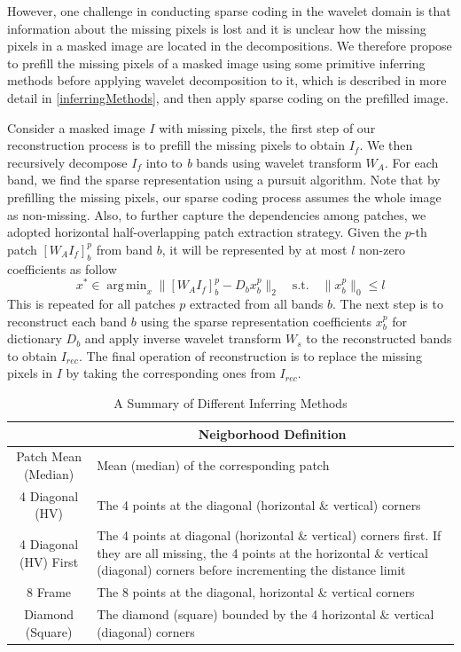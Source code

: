 \documentclass[conference]{IEEEtran}
\begin{document}
However, one challenge in conducting sparse coding in the wavelet domain is that information about the missing pixels is lost and it is unclear how the missing pixels in a masked image are located in the decompositions. We therefore propose to prefill the missing pixels of a masked image using some primitive inferring methods before applying wavelet decomposition to it, which is described in more detail in \ref{inferringMethods}, and then apply sparse coding on the prefilled image.

Consider a masked image $I$ with missing pixels, the first step of our reconstruction process is to prefill the missing pixels to obtain $I_f$. We then recursively decompose $I_f$ into to \textit{b} bands using wavelet transform $W_A$. For each band, we find the sparse representation using a pursuit algorithm. Note that by prefilling the missing pixels, our sparse coding process assumes the whole image as non-missing. Also, to further capture the dependencies among patches, we adopted horizontal half-overlapping patch extraction strategy. Given the $p$-th patch $[W_AI_f]^{p}_b$ from band $b$, it will be represented by at most $l$ non-zero coefficients as follow
\begin{equation}
x^{*} \in \operatorname{arg\,min}_x \|[W_AI_f]^{p}_b-D_bx^{p}_b\|_2
\quad \text{s.t.} \quad \|x^{p}_b\|_0 \leq l
\end{equation}
This is repeated for all patches $p$ extracted from all bands $b$. The next step is to reconstruct each band $b$ using the sparse representation coefficients $x^{p}_b$ for dictionary $D_b$ and apply inverse wavelet transform $W_s$ to the reconstructed bands to obtain $I_{rec}$. The final operation of reconstruction is to replace the missing pixels in $I$ by taking the corresponding ones from $I_{rec}$.

\begin{table}
\centering
\renewcommand{\arraystretch}{1.1}
\caption{A Summary of Different Inferring Methods}
\label{inferringMethodsTable}
\begin{tabular}{m{2cm} m{5.5cm}}
\hline
\rowcolor{lightgray}\multicolumn{1}{c}{Method Name} & \multicolumn{1}{c}{Neigborhood Definition}\\
\hline
\multicolumn{1}{c}{Patch Mean (Median)} & Mean (median) of the corresponding patch \\
\hline
\multicolumn{1}{c}{4 Diagonal (HV)} & The 4 points at the diagonal (horizontal \& vertical) corners\\
\hline
\multicolumn{1}{c}{4 Diagonal (HV) First} & The 4 points at diagonal (horizontal \& vertical) corners first. If they are all missing, the 4 points at the horizontal \& vertical (diagonal) corners before incrementing the distance limit \\
\hline
\multicolumn{1}{c}{8 Frame} & The 8 points at the diagonal, horizontal \& vertical corners \\
\hline
\multicolumn{1}{c}{Diamond (Square)} & The diamond (square) bounded by the 4 horizontal \& vertical  (diagonal) corners \\
\hline
\end{tabular}
\end{table}
\end{document}

